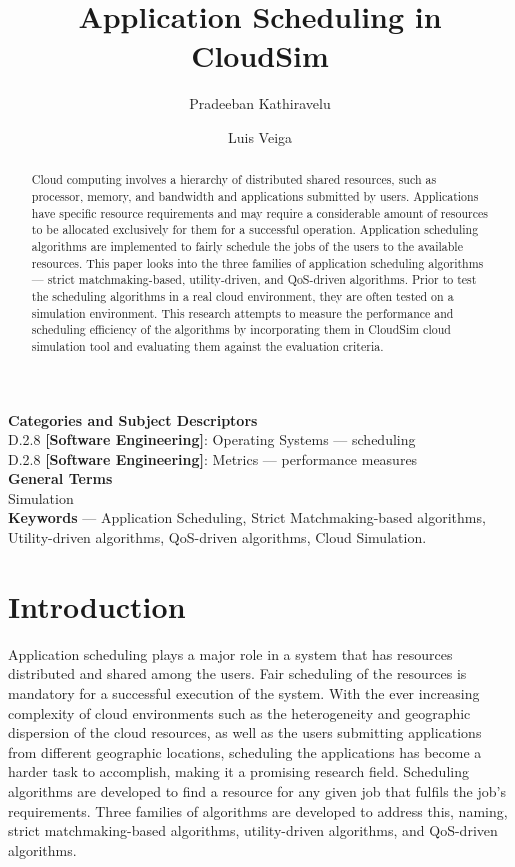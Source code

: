 \documentclass{llncs}
\begin{document}
\title{Application Scheduling in CloudSim}

\author{Pradeeban Kathiravelu \and Luis Veiga}


\maketitle
%
\begin{abstract}
Cloud computing involves a  hierarchy of distributed shared resources, such as processor, memory, and bandwidth and applications submitted by users. Applications have specific resource requirements and may require a considerable amount of resources to be allocated exclusively for them for a successful operation. Application scheduling algorithms are implemented to fairly schedule the jobs of the users to the available resources. This paper looks into the three families of application scheduling algorithms --- strict matchmaking-based, utility-driven, and QoS-driven algorithms. Prior to test the scheduling algorithms in a real cloud environment, they are often tested on a simulation environment. This research attempts to measure the performance and scheduling efficiency of the algorithms by incorporating them in CloudSim cloud simulation tool and evaluating them against the evaluation criteria.
\end{abstract}
\textbf{Categories and Subject Descriptors}\\
D.2.8 \textbf{[Software Engineering]}: Operating Systems --- scheduling\\
D.2.8 \textbf{[Software Engineering]}: Metrics --- performance measures\\
\textbf{General Terms}\\
Simulation\\
\textbf{Keywords} ---  Application Scheduling, Strict Matchmaking-based algorithms, Utility-driven algorithms, QoS-driven algorithms, Cloud Simulation.
%
\section{Introduction}
%
Application scheduling plays a major role in a system that has resources distributed and shared among the users. Fair scheduling of the resources is mandatory for a successful execution of the system. With the ever increasing complexity of cloud environments such as the heterogeneity and geographic dispersion of the cloud resources, as well as the users submitting applications from different geographic locations, scheduling the applications has become a harder task to accomplish, making it a promising research field. Scheduling algorithms are developed to find a resource for any given job that fulfils the job's requirements. Three families of algorithms are developed to address this, naming, strict matchmaking-based algorithms, utility-driven algorithms, and QoS-driven algorithms.
\end{document}
